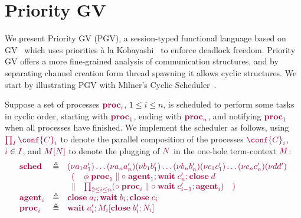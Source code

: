 \documentclass[main.tex]{subfiles}
\begin{document}
\section{Priority GV}\label{sec:pgv}

We present Priority GV (PGV), a session-typed functional language based on GV~\cite{wadler15,lindleymorris15} which uses priorities \`{a} la Kobayashi~\cite{kobayashi06,padovaninovara15} to enforce deadlock freedom.
Priority GV offers a more fine-grained analysis of communication structures, and by separating channel creation form thread spawning it allows cyclic structures. We start by illustrating PGV with Milner's Cyclic Scheduler~\cite{milner89}.

\begin{example}\label{sec:pgv-example}
Suppose a set of processes $\tm{\proc{i}}$, $1\leq{i}\leq{n}$, is scheduled to perform some tasks in cyclic order, starting with $\tm{\proc1}$, ending with $\tm{\proc{n}}$, and notifying $\tm{\proc1}$ when all processes have finished.
We implement the scheduler as follows, using $\tm{\prod_{I}\conf{C}_i}$ to denote the parallel composition of the processes $\tm{\conf{C}_i}$, $\tm{i}\in\tm{I}$, and $\tm{\plug{M}{N}}$ to denote the plugging of $\tm{N}$ in the one-hole term-context $\tm{M}$:
\[
  \begin{array}{lrlr}
    \tm{\sched}
    & \defeq & \tm{\res{a_1}{a'_1}{\dots{\res{a_n}{a'_n}{}}}}
               \tm{\res{b_1}{b'_1}{\dots{\res{b_n}{b'_n}{}}}}
               \tm{\res{c_1}{c'_1}{\dots{\res{c_n}{c'_n}{}}}}
               \tm{\res{d}{d'}{}}
    \\ &     & \tm{\begin{array}{lll}
                     (
                     & \phi\;\proc1
                     \parallel
                     \child\;\andthen{\agent1}{\andthen{\wait\;{c'_n}}{\close\;{d}}}
                     \\
                     \parallel
                     &
                     \prod_{2\leq{i}\leq{n}}
                     (\child\;\proc{i} \parallel \child\;\andthen{\wait\;{c'_{i-1}}}{\agent{i}})
                     & )
                   \end{array}}
    \\
    \tm{\agent{i}}
    & \defeq & \tm{\andthen{\close\;{a_i}}{\andthen{\wait\;{b_i}}{\close\;{c_i}}}}
    \\
    \tm{\proc{i}}
    & \defeq & \tm{\andthen{\wait\;{a'_i}}{\plug{M_i}{\andthen{\close\;{b'_i}}{N_i}}}}

\end{array}\]
\end{example}
\end{document}
